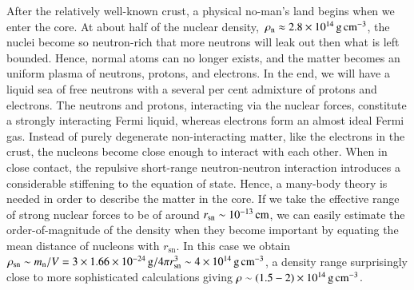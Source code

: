 
After the relatively well-known crust, a physical no-man's land begins when we enter the core.
At about half of the nuclear density, $\, \rho_{\mathrm{n}}  \approx 2.8 \times 10^{14}\, \mathrm{g}\,\mathrm{cm}^{-3}$, the nuclei become so neutron-rich that more neutrons will leak out then what is left bounded.
Hence, normal atoms can no longer exists, and the matter becomes an uniform plasma of neutrons, protons, and electrons.
In the end, we will have a liquid sea of free neutrons with a several per cent admixture of protons and electrons.
The neutrons and protons, interacting via the nuclear forces, constitute a strongly interacting Fermi liquid, whereas electrons form an almost ideal Fermi gas.
Instead of purely degenerate non-interacting matter, like the electrons in the crust, the nucleons become close enough to interact with each other.
When in close contact, the repulsive short-range neutron-neutron interaction introduces a considerable stiffening to the equation of state.
Hence, a many-body theory is needed in order to describe the matter in the core.
If we take the effective range of strong nuclear forces to be of around $r_{\mathrm{sn}} \sim 10^{-13}\, \mathrm{cm}$, we can easily estimate the order-of-magnitude of the density when they become important by equating the mean distance of nucleons with $r_{\mathrm{sn}}$.
In this case we obtain $\rho_{\mathrm{sn}} \sim m_{\mathrm{n}} / V = 3 \times 1.66 \times 10^{-24} \, \mathrm{g} / 4\pi r_{\mathrm{sn}}^3 \sim 4 \times 10^{14} \, \mathrm{g}\,\mathrm{cm}^{-3}$, a density range surprisingly close to more sophisticated calculations giving $\rho \sim (1.5 - 2) \times 10^{14} \, \mathrm{g}\,\mathrm{cm}^{-3}$.\cite[such estimates were first presented by Hund][]{Hund36}


